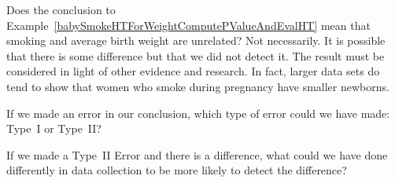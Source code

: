 \begin{examplewrap}
\begin{nexample}
{Does the conclusion to Example~\ref{babySmokeHTForWeightComputePValueAndEvalHT} mean that smoking and average birth weight are unrelated?}
Not necessarily. It is possible that there is some difference but that we did not detect it.  The result must be considered in light of other evidence and research.  In fact, larger data sets do tend to show that women who smoke during pregnancy have smaller newborns.
\end{nexample}
\end{examplewrap}


\begin{exercisewrap}
\begin{nexercise}
If we made an error in our conclusion, which type of error could we have made: Type~I or Type~II?\footnotemark
\end{nexercise}
\end{exercisewrap}


\begin{exercisewrap}
\begin{nexercise} \label{babySmokeHTIDingHowToDetectDifferences}
If we made a Type~II Error and there is a difference, what could we have done differently in data collection to be more likely to detect the difference?\footnotemark
\end{nexercise}
\end{exercisewrap}


\D{\newpage}

